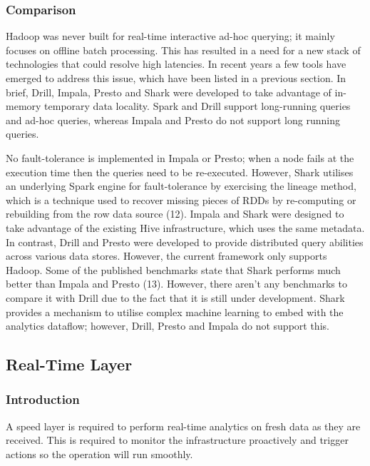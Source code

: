 \subsubsection{Comparison} \label{subsubsec-lr-servinglayer-comparison}
Hadoop was never built for real-time interactive ad-hoc querying; it mainly focuses on offline batch processing. This has resulted in a need for a new stack of technologies that could resolve high latencies. In recent years a few tools have emerged to address this issue, which have been listed in a previous section. In brief, Drill, Impala, Presto and Shark were developed to take advantage of in-memory temporary data locality. Spark and Drill support long-running queries and ad-hoc queries, whereas Impala and Presto do not support long running queries.

No fault-tolerance is implemented in Impala or Presto; when a node fails at the execution time then the queries need to be re-executed. However, Shark utilises an underlying Spark engine for fault-tolerance by exercising the lineage method, which is a technique used to recover missing pieces of RDDs by re-computing or rebuilding from the row data source (12). Impala and Shark were designed to take advantage of the existing Hive infrastructure, which uses the same metadata. In contrast, Drill and Presto were developed to provide distributed query abilities across various data stores. However, the current framework only supports Hadoop. Some of the published benchmarks state that Shark performs much better than Impala and Presto (13). However, there aren’t any benchmarks to compare it with Drill due to the fact that it is still under development. Shark provides a mechanism to utilise complex machine learning to embed with the analytics dataflow; however, Drill, Presto and Impala do not support this.

\subsection{Real-Time Layer} \label{subsec-lr-servinglayer}

\subsubsection{Introduction} \label{subsubsec-lr-reallayer-intro}
A speed layer is required to perform real-time analytics on fresh data as they are received. This is required to monitor the infrastructure proactively and trigger actions so the operation will run smoothly.


